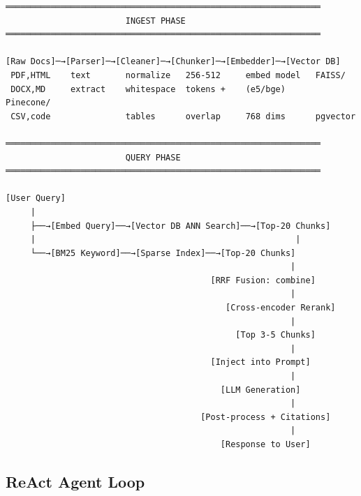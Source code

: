 \documentclass[11pt]{article}
\begin{document}
\setcodelang{}

\begin{verbatim}
═══════════════════════════════════════════════════════════════
                        INGEST PHASE
═══════════════════════════════════════════════════════════════

[Raw Docs]─→[Parser]─→[Cleaner]─→[Chunker]─→[Embedder]─→[Vector DB]
 PDF,HTML    text       normalize   256-512     embed model   FAISS/
 DOCX,MD     extract    whitespace  tokens +    (e5/bge)      Pinecone/
 CSV,code               tables      overlap     768 dims      pgvector

═══════════════════════════════════════════════════════════════
                        QUERY PHASE
═══════════════════════════════════════════════════════════════

[User Query]
     |
     ├──→[Embed Query]──→[Vector DB ANN Search]──→[Top-20 Chunks]
     |                                                    |
     └──→[BM25 Keyword]──→[Sparse Index]──→[Top-20 Chunks]
                                                         |
                                         [RRF Fusion: combine]
                                                         |
                                            [Cross-encoder Rerank]
                                                         |
                                              [Top 3-5 Chunks]
                                                         |
                                         [Inject into Prompt]
                                                         |
                                           [LLM Generation]
                                                         |
                                       [Post-process + Citations]
                                                         |
                                           [Response to User]
\end{verbatim}

\subsection{ReAct Agent Loop}\label{react-agent-loop}

\setcodelang{}
\end{document}
